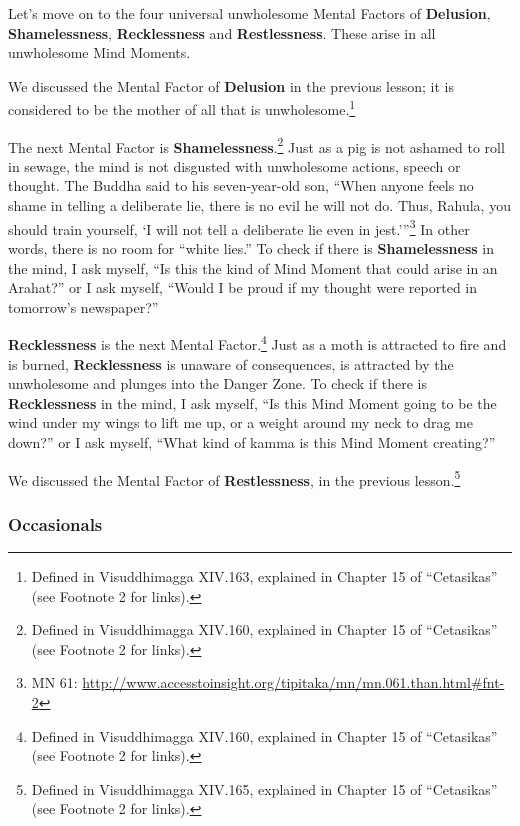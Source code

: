 Let’s move on to the four universal unwholesome Mental Factors of \textbf{Delusion}, \textbf{Shamelessness}, \textbf{Recklessness} and \textbf{Restlessness}. These arise in all unwholesome Mind Moments.

We discussed the Mental Factor of \textbf{Delusion} in the previous lesson; it is considered to be the mother of all that is unwholesome.\footnote{Defined in Visuddhimagga XIV.163, explained in Chapter 15 of “Cetasikas” (see Footnote 2 for links).}

The next Mental Factor is \textbf{Shamelessness}.\footnote{Defined in Visuddhimagga XIV.160, explained in Chapter 15 of “Cetasikas” (see Footnote 2 for links).} Just as a pig is not ashamed to roll in sewage, the mind is not disgusted with unwholesome actions, speech or thought. The Buddha said to his seven-year-old son, “When anyone feels no shame in telling a deliberate lie, there is no evil he will not do. Thus, Rahula, you should train yourself, `I will not tell a deliberate lie even in jest.’”\footnote{MN 61: \url{http://www.accesstoinsight.org/tipitaka/mn/mn.061.than.html\#fnt-2}} In other words, there is no room for “white lies.” To check if there is \textbf{Shamelessness} in the mind, I ask myself, “Is this the kind of Mind Moment that could arise in an Arahat?” or I ask myself, “Would I be proud if my thought were reported in tomorrow’s newspaper?”

\textbf{Recklessness} is the next Mental Factor.\footnote{Defined in Visuddhimagga XIV.160, explained in Chapter 15 of “Cetasikas” (see Footnote 2 for links).} Just as a moth is attracted to fire and is burned, \textbf{Recklessness} is unaware of consequences, is attracted by the unwholesome and plunges into the Danger Zone. To check if there is \textbf{Recklessness} in the mind, I ask myself, “Is this Mind Moment going to be the wind under my wings to lift me up, or a weight around my neck to drag me down?” or I ask myself, “What kind of kamma is this Mind Moment creating?”

We discussed the Mental Factor of \textbf{Restlessness}, in the previous lesson.\footnote{Defined in Visuddhimagga XIV.165, explained in Chapter 15 of “Cetasikas” (see Footnote 2 for links).}

\subsubsection*{Occasionals}

